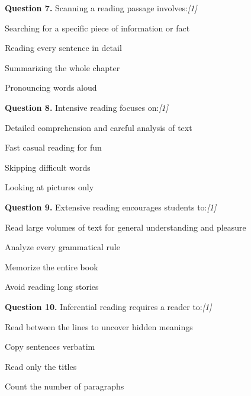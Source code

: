 \documentclass[11pt,a4paper]{article}
\newcommand{\pts}[1]{\hfill   \textit{[#1]}}
\begin{document}
\medskip




\noindent   \textbf{Question 7.} Scanning a reading passage involves:\pts{1}

\begin{parts}
  \item Searching for a specific piece of information or fact
  \item Reading every sentence in detail
  \item Summarizing the whole chapter
  \item Pronouncing words aloud
\end{parts}

\medskip




\noindent   \textbf{Question 8.} Intensive reading focuses on:\pts{1}

\begin{parts}
  \item Detailed comprehension and careful analysis of text
  \item Fast casual reading for fun
  \item Skipping difficult words
  \item Looking at pictures only
\end{parts}

\medskip




\noindent   \textbf{Question 9.} Extensive reading encourages students to:\pts{1}

\begin{parts}
  \item Read large volumes of text for general understanding and pleasure
  \item Analyze every grammatical rule
  \item Memorize the entire book
  \item Avoid reading long stories
\end{parts}

\medskip




\noindent   \textbf{Question 10.} Inferential reading requires a reader to:\pts{1}

\begin{parts}
  \item Read between the lines to uncover hidden meanings
  \item Copy sentences verbatim
  \item Read only the titles
  \item Count the number of paragraphs
\end{parts}
\end{document}

